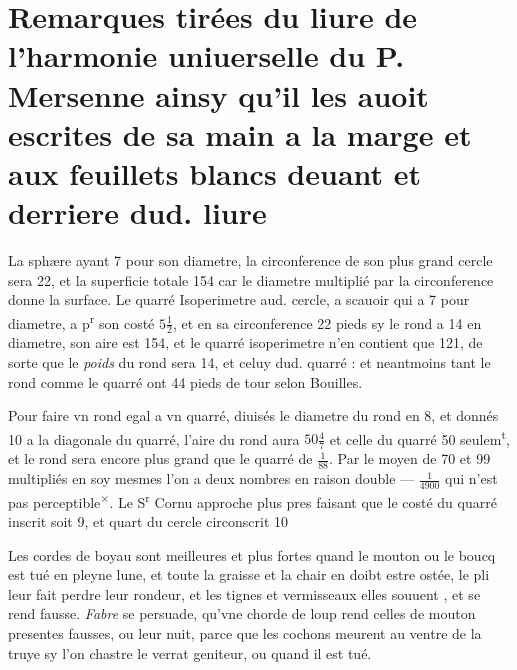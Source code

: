 \documentclass[11pt,a4paper]{article}
\begin{document}
\section*{Remarques tirées du liure de l'harmonie uniuerselle du P. Mersenne ainsy qu'il les auoit escrites de sa main a la marge et aux feuillets blancs deuant et derriere dud. liure}

La sphære ayant 7 pour son diametre, la circonference de son plus grand cercle sera 22, et la superficie totale 154 car le diametre multiplié par la circonference donne la surface. Le quarré Isoperimetre aud. cercle, a scauoir qui a 7 pour diametre, a p\textsuperscript{r} son costé $5\frac{1}{2}$, et en sa circonference 22 pieds sy le rond a 14 en diametre, son aire est 154, et le quarré isoperimetre n'en contient que 121, de sorte que le \emph{poids} du rond sera 14, et celuy dud. quarré : et neantmoins tant le rond comme le quarré ont 44 pieds de tour selon Bouilles.

Pour faire vn rond egal a vn quarré, diuisés le diametre du rond en 8, et donnés 10 a la diagonale du quarré, l'aire du rond aura $50\frac{4}{7}$ et celle du  quarré 50 seulem\textsuperscript{t}, et le rond sera encore plus grand que le quarré de $\frac{1}{88}$. Par le moyen de 70 et 99 multipliés en soy mesmes l'on a deux nombres en raison double --- $\frac{1}{4900}$ qui n'est pas perceptible\textsuperscript{$\times$}. Le S\textsuperscript{r} Cornu approche plus pres faisant que le costé du quarré inscrit soit 9, et quart du cercle circonscrit 10

Les cordes de boyau sont meilleures et plus fortes quand le mouton ou le boucq est tué en pleyne lune, et toute la graisse et la chair en doibt estre ostée, le pli leur fait perdre leur rondeur, et les tignes et vermisseaux elles souuent , et se rend fausse. \emph{Fabre} se persuade, qu'vne chorde de loup rend celles de mouton presentes fausses, ou leur nuit, parce que les cochons meurent au ventre de la truye sy l'on chastre le verrat geniteur, ou quand il est tué.
\end{document}
